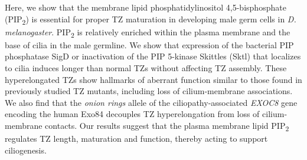 \documentclass[12pt, twoside, letterpaper]{article}
\newcommand{\PIP}{PIP\textsubscript{2}}
\begin{document}
\begin{doublespacing}
\begin{linenumbers}
    Here, we show that the membrane lipid phosphatidylinositol 4,5-bisphosphate (\PIP{})
    is essential for proper TZ maturation in developing male germ cells
    in \textit{D. melanogaster}.
    \PIP{} is relatively enriched within the plasma membrane and the base of cilia
    in the male germline.
    We show that expression of the bacterial PIP phosphatase SigD
    or inactivation of the PIP 5-kinase Skittles (Sktl) that localizes to cilia
    induces longer than normal TZs without affecting TZ assembly.
    These hyperelongated TZs show hallmarks of aberrant function similar to those
    found in previously studied TZ mutants,
    including loss of cilium-membrane associations.
    We also find that the \textit{onion rings} allele of the
    ciliopathy-associated \textit{EXOC8} gene encoding the human Exo84
    decouples TZ hyperelongation from loss of cilium-membrane contacts.
    Our results suggest that the plasma membrane lipid \PIP{} regulates TZ length,
    maturation and function, thereby acting to support ciliogenesis.


\end{linenumbers}
\end{doublespacing}
\end{document}
